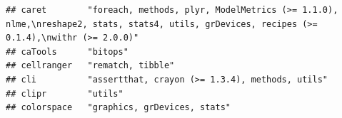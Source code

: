\documentclass[]{article}
\begin{document}
\begin{verbatim}
## caret        "foreach, methods, plyr, ModelMetrics (>= 1.1.0), nlme,\nreshape2, stats, stats4, utils, grDevices, recipes (>= 0.1.4),\nwithr (>= 2.0.0)"                                                                                                                                                                                                                                                                                                                                            
## caTools      "bitops"                                                                                                                                                                                                                                                                                                                                                                                                                                                                              
## cellranger   "rematch, tibble"                                                                                                                                                                                                                                                                                                                                                                                                                                                                     
## cli          "assertthat, crayon (>= 1.3.4), methods, utils"                                                                                                                                                                                                                                                                                                                                                                                                                                       
## clipr        "utils"                                                                                                                                                                                                                                                                                                                                                                                                                                                                               
## colorspace   "graphics, grDevices, stats"                                                                                                                                                                                                                                                                                                                                                                                                                                                          

\end{verbatim}
\end{document}
